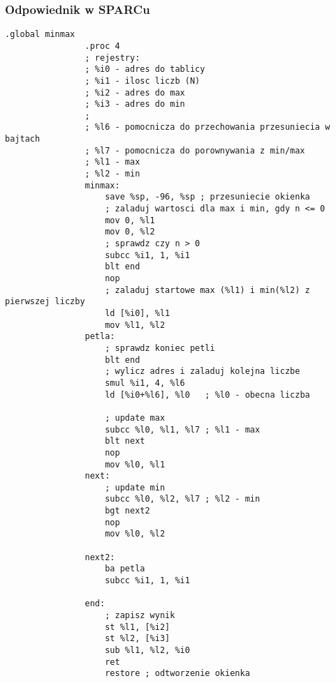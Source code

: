 		\subsubsection{Odpowiednik w SPARCu}
			\begin{lstlisting}[language={[sparc]Assembler}]
				.global minmax
				.proc 4
				; rejestry:
				; %i0 - adres do tablicy
				; %i1 - ilosc liczb (N)
				; %i2 - adres do max
				; %i3 - adres do min
				;
				; %l6 - pomocnicza do przechowania przesuniecia w bajtach
				; %l7 - pomocnicza do porownywania z min/max
				; %l1 - max
				; %l2 - min
				minmax:
					save %sp, -96, %sp ; przesuniecie okienka
					; zaladuj wartosci dla max i min, gdy n <= 0
					mov 0, %l1
					mov 0, %l2
					; sprawdz czy n > 0
					subcc %i1, 1, %i1
					blt end
					nop
					; zaladuj startowe max (%l1) i min(%l2) z pierwszej liczby
					ld [%i0], %l1
					mov %l1, %l2
				petla:
					; sprawdz koniec petli
					blt end
					; wylicz adres i zaladuj kolejna liczbe
					smul %i1, 4, %l6
					ld [%i0+%l6], %l0	; %l0 - obecna liczba
				
					; update max
					subcc %l0, %l1, %l7	; %l1 - max
					blt next
					nop
					mov %l0, %l1
				next:
					; update min
					subcc %l0, %l2, %l7	; %l2 - min
					bgt next2
					nop
					mov %l0, %l2
				
				next2:
					ba petla
					subcc %i1, 1, %i1
				
				end:
					; zapisz wynik
					st %l1, [%i2]
					st %l2, [%i3]
					sub %l1, %l2, %i0
					ret
					restore ; odtworzenie okienka
			\end{lstlisting}
			
